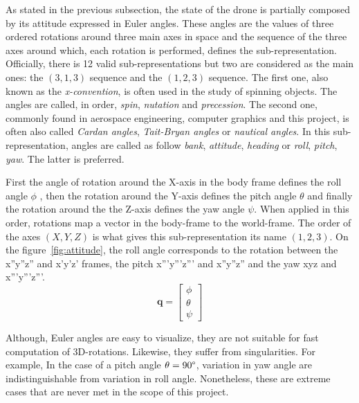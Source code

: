 \documentclass[a4paper, 12pt]{report}
\begin{document}
As stated in the previous subsection, the state of the drone is partially composed by its attitude expressed in Euler angles. These angles are the values of three ordered rotations around three main axes in space and the sequence of the three axes around which, each rotation is performed, defines the sub-representation.  Officially, there is 12 valid sub-representations but two are considered as the main ones: the $(3,1,3)$ sequence and the $(1,2,3)$ sequence. The first one, also known as the \emph{x-convention}, is often used in the study of spinning objects. The angles are called, in order, \emph{spin}, \emph{nutation} and \emph{precession}. The second one, commonly found in aerospace engineering, computer graphics and this project, is often also called \emph{Cardan angles}, \emph{Tait-Bryan angles} or \emph{nautical angles}. In this sub-representation, angles are called as follow \emph{bank}, \emph{attitude}, \emph{heading} or \emph{roll}, \emph{pitch}, \emph{yaw}. The latter is preferred. 

First the angle of rotation around the X-axis in the body frame defines the roll angle $\phi$ , then the rotation around the Y-axis defines the pitch angle $\theta$ and finally the rotation around the the Z-axis defines the yaw angle $\psi$. When applied in this order, rotations map a vector in the body-frame to the world-frame. The order of the axes $(X,Y,Z)$ is what gives this sub-representation its name $(1,2,3)$. On the figure~\ref{fig:attitude}, the roll angle corresponds to the rotation between the x''y''z'' and x'y'z' frames, the pitch x'''y'''z''' and x''y''z'' and the yaw xyz and x'''y'''z'''.
\[\boldsymbol{q} =  \begin{bmatrix} \phi \\ \theta \\ \psi \end{bmatrix}\]

Although, Euler angles are easy to visualize, they are not suitable for fast computation of 3D-rotations. Likewise, they suffer from singularities. For example, In the case of a pitch angle $\theta=90\degree$, variation in yaw angle are indistinguishable from variation in roll angle. Nonetheless, these are extreme cases that are never met in the scope of this project.
\end{document}
